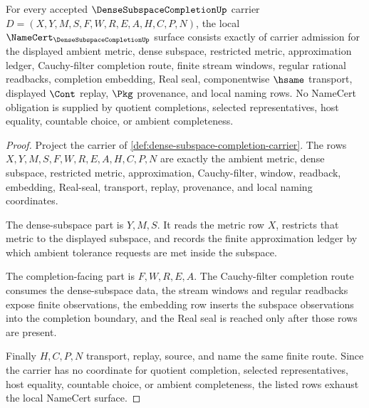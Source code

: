 \begin{theorem}
\label{thm:dense-subspace-completion-namecert-obligations}
For every accepted $\DenseSubspaceCompletionUp$ carrier $D=(X,Y,M,S,F,W,R,E,A,H,C,P,N)$, the local $\NameCert_{\DenseSubspaceCompletionUp}$ surface consists exactly of carrier admission for the displayed ambient metric, dense subspace, restricted metric, approximation ledger, Cauchy-filter completion route, finite stream windows, regular rational readbacks, completion embedding, Real seal, componentwise $\hsame$ transport, displayed $\Cont$ replay, $\Pkg$ provenance, and local naming rows. No NameCert obligation is supplied by quotient completions, selected representatives, host equality, countable choice, or ambient completeness.
\end{theorem}
\begin{proof}
Project the carrier of \autoref{def:dense-subspace-completion-carrier}. The rows $X,Y,M,S,F,W,R,E,A,H,C,P,N$ are exactly the ambient metric, dense subspace, restricted metric, approximation, Cauchy-filter, window, readback, embedding, Real-seal, transport, replay, provenance, and local naming coordinates.

The dense-subspace part is $Y,M,S$. It reads the metric row $X$, restricts that metric to the displayed subspace, and records the finite approximation ledger by which ambient tolerance requests are met inside the subspace.

The completion-facing part is $F,W,R,E,A$. The Cauchy-filter completion route consumes the dense-subspace data, the stream windows and regular readbacks expose finite observations, the embedding row inserts the subspace observations into the completion boundary, and the Real seal is reached only after those rows are present.

Finally $H,C,P,N$ transport, replay, source, and name the same finite route. Since the carrier has no coordinate for quotient completion, selected representatives, host equality, countable choice, or ambient completeness, the listed rows exhaust the local NameCert surface.
\end{proof}

